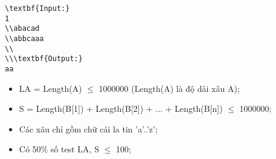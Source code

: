 \begin{verbatim}
\textbf{Input:}
1
\\abacad
\\abbcaaa
\\
\\\textbf{Output:}
aa\end{verbatim}
\begin{itemize}
	\item     LA = Length(A)  $\le$  1000000 (Length(A) là độ dài xâu A);   
	\item     S = Length(B[1]) + Length(B[2]) + ... + Length(B[n])  $\le$  1000000;   
	\item     Các xâu chỉ gồm chữ cái la tin 'a'..'z';   
	\item     Có 50\% số test LA, S  $\le$  100;   
\end{itemize}